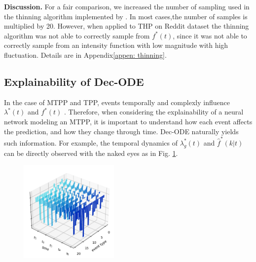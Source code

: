\textbf{Discussion.} For a fair comparison, we increased the number of sampling used in the thinning algorithm \cite{lec:thinning, bib:thinning_ogata} implemented by \cite{bib:ANHP}. In most cases,the number of samples is multiplied by 20. However, when applied to THP on Reddit dataset the thinning algorithm was not able to correctly sample from $f^*(t)$, since it was not able to correctly sample from an intensity function with low magnitude with high fluctuation.
Details are in Appendix\ref{appen: thinning}.

\subsection{Explainability of Dec-ODE\label{exp: explainability}}

In the case of MTPP and TPP, events temporally and complexly influence $\lambda ^*(t)$ and $f^*(t)$ \cite{bib:hawkesOrigin, ISHAM1979335}. 
Therefore, when considering the explainability of a neural network modeling an MTPP, 
it is important to understand how each event affects the prediction, and how they change through time.
Dec-ODE naturally yields such information. 
For example, the temporal dynamics of $\lambda_g ^* (t)$ and $\hat{f}^*(k|t)$ can be directly observed with the naked eyes as in Fig.  \ref{fig: so fk}.

\begin{figure}
    \includegraphics[width=0.92\linewidth, height = 5cm]{figure/fk_dynamic.png}
    \captionsetup[figure]{font=small, justification=justified, margin=0.1cm}
    \label{fig: so fk}
\end{figure} 


